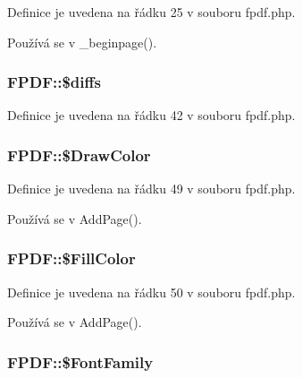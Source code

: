 Definice je uvedena na řádku 25 v souboru fpdf.\-php.



Používá se v \-\_\-beginpage().

\hypertarget{class_f_p_d_f_ab4031513b29691bb8fb7107c73cc2d64}{
\subsubsection[{\$diffs}]{\setlength{\rightskip}{0pt plus 5cm}F\-P\-D\-F\-::\$diffs}}\label{class_f_p_d_f_ab4031513b29691bb8fb7107c73cc2d64}


Definice je uvedena na řádku 42 v souboru fpdf.\-php.

\hypertarget{class_f_p_d_f_a80a2ec9b8a4e1104bc093c0856766db3}{
\subsubsection[{\$\-Draw\-Color}]{\setlength{\rightskip}{0pt plus 5cm}F\-P\-D\-F\-::\$\-Draw\-Color}}\label{class_f_p_d_f_a80a2ec9b8a4e1104bc093c0856766db3}


Definice je uvedena na řádku 49 v souboru fpdf.\-php.



Používá se v Add\-Page().

\hypertarget{class_f_p_d_f_a75f15d0e648b984c9209c32388912aeb}{
\subsubsection[{\$\-Fill\-Color}]{\setlength{\rightskip}{0pt plus 5cm}F\-P\-D\-F\-::\$\-Fill\-Color}}\label{class_f_p_d_f_a75f15d0e648b984c9209c32388912aeb}


Definice je uvedena na řádku 50 v souboru fpdf.\-php.



Používá se v Add\-Page().

\hypertarget{class_f_p_d_f_a5f8c02cd5e40614758f3ffc421e06b78}{
\subsubsection[{\$\-Font\-Family}]{\setlength{\rightskip}{0pt plus 5cm}F\-P\-D\-F\-::\$\-Font\-Family}}\label{class_f_p_d_f_a5f8c02cd5e40614758f3ffc421e06b78}


